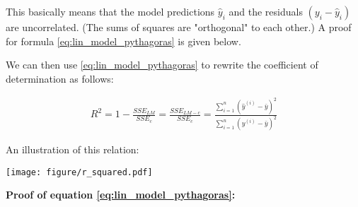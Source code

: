 {\begin{enumerate}[1.]
This basically means that the model predictions \(\hat{y}_i\) and the residuals \( (y_i - \hat{y}_i) \) are uncorrelated.
(The sums of squares are "orthogonal" to each other.)
A proof for formula \eqref{eq:lin_model_pythagoras} is given below.

We can then use \eqref{eq:lin_model_pythagoras} to rewrite the coefficient of determination as follows:

\begin{align*}
    R^2 = 1-\frac{SSE_{LM}}{SSE_{c}} = \frac{SSE_{LM-c}}{SSE_{c}} = \frac{\sum_{i=1}^n (\hat{y}^{(i)} - \bar{y})^2}{\sum_{i=1}^n (y^{(i)} - \bar{y})^2}
\end{align*}


An illustration of this relation:

\begin{center}
	\texttt{[image: figure/r\_squared.pdf]}
\end{center}

\end{enumerate}


\textbf{Proof of equation \eqref{eq:lin_model_pythagoras}:}

\fbox{\parbox{\linewidth}{
		
}}}
